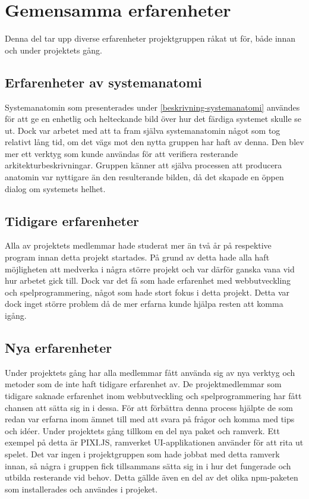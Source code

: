 
\section{Gemensamma erfarenheter}
Denna del tar upp diverse erfarenheter projektgruppen råkat ut för, både innan och under projektets gång.

\subsection{Erfarenheter av systemanatomi}
Systemanatomin som presenterades under \ref{beskrivning-systemanatomi} användes för att ge en enhetlig och helteckande bild över hur det färdiga systemet skulle se ut. Dock var arbetet med att ta fram själva systemanatomin något som tog relativt lång tid, om det vägs mot den nytta gruppen har haft av denna. Den blev mer ett verktyg som kunde användas för att verifiera resterande arkitekturbeskrivningar. Gruppen känner att själva processen att producera anatomin var nyttigare än den resulterande bilden, då det skapade en öppen dialog om systemets helhet.

\subsection{Tidigare erfarenheter}
Alla av projektets medlemmar hade studerat mer än två år på respektive program innan detta projekt startades. På grund av detta hade alla haft möjligheten att medverka i några större projekt och var därför ganska vana vid hur arbetet gick till. Dock var det få som hade erfarenhet med webbutveckling och spelprogrammering, något som hade stort fokus i detta projekt. Detta var dock inget större problem då de mer erfarna kunde hjälpa resten att komma igång.

\subsection{Nya erfarenheter}
Under projektets gång har alla medlemmar fått använda sig av nya verktyg och metoder som de inte haft tidigare erfarenhet av. De projektmedlemmar som tidigare saknade erfarenhet inom webbutveckling och spelprogrammering har fått chansen att sätta sig in i dessa. För att förbättra denna process hjälpte de som redan var erfarna inom ämnet till med att svara på frågor och komma med tips och idéer. Under projektets gång tillkom en del nya paket och ramverk. Ett exempel på detta är PIXI.JS, ramverket UI-applikationen använder för att rita ut spelet. Det var ingen i projektgruppen som hade jobbat med detta ramverk innan, så några i gruppen fick tillsammans sätta sig in i hur det fungerade och utbilda resterande vid behov. Detta gällde även en del av det olika npm-paketen som installerades och användes i projeket.


